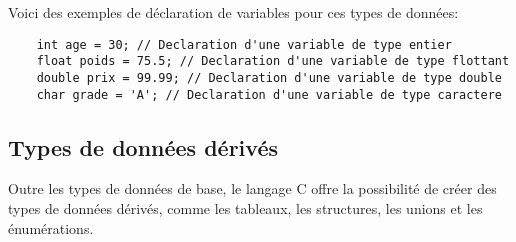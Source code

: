 Voici des exemples de déclaration de variables pour ces types de données:

\begin{lstlisting}
	int age = 30; // Declaration d'une variable de type entier
	float poids = 75.5; // Declaration d'une variable de type flottant
	double prix = 99.99; // Declaration d'une variable de type double
	char grade = 'A'; // Declaration d'une variable de type caractere
\end{lstlisting}

\subsection{Types de données dérivés}

Outre les types de données de base, le langage C offre la possibilité de créer des types de données dérivés, comme les tableaux, les structures, les unions et les énumérations.

